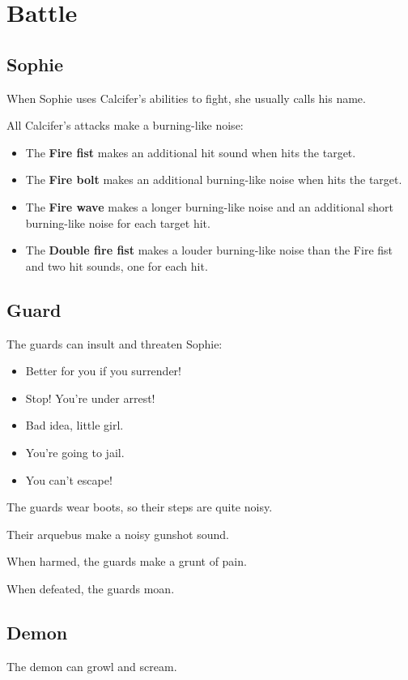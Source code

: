 \section{Battle}

\subsection{Sophie}
When Sophie uses Calcifer's abilities to fight, she usually calls his name.

All Calcifer's attacks make a burning-like noise:

\begin{itemize}
\item The \textbf{Fire fist} makes an additional hit sound when hits the target.
\item The \textbf{Fire bolt} makes an additional burning-like noise when hits the target.
\item The \textbf{Fire wave} makes a longer burning-like noise and an additional short burning-like noise for each target hit.
\item The \textbf{Double fire fist} makes a louder burning-like noise than the Fire fist and two hit sounds, one for each hit.
\end{itemize}


\subsection{Guard}
The guards can insult and threaten Sophie:
\begin{itemize}
	\item Better for you if you surrender!
	\item Stop! You're under arrest!
	\item Bad idea, little girl.
	\item You're going to jail.
	\item You can't escape!
\end{itemize}

The guards wear boots, so their steps are quite noisy.

Their arquebus make a noisy gunshot sound.

When harmed, the guards make a grunt of pain.

When defeated, the guards moan.

\subsection{Demon}
The demon can growl and scream.

